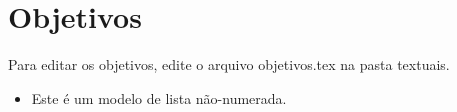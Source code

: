 \chapter{Objetivos}

Para editar os objetivos, edite o arquivo objetivos.tex na pasta textuais. 


\begin{itemize}
	\item Este é um modelo de lista não-numerada.
\end{itemize}


